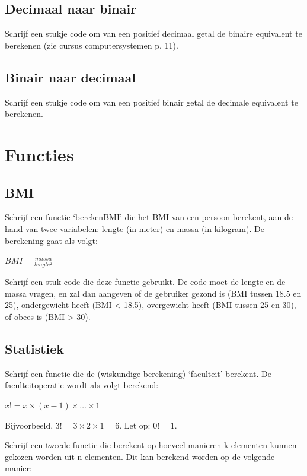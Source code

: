 \subsection{Decimaal naar binair}

Schrijf een stukje code om van een positief decimaal getal de binaire equivalent te berekenen (zie cursus computersystemen p. 11).

\subsection{Binair naar decimaal}

Schrijf een stukje code om van een positief binair getal de decimale equivalent te berekenen.

% 

\section{Functies}

\subsection{BMI}

Schrijf een functie `berekenBMI' die het BMI van een persoon berekent, aan de hand van twee variabelen: lengte (in meter) en massa (in kilogram). De berekening gaat als volgt:

$BMI = \frac{massa}{lengte^2}$

Schrijf een stuk code die deze functie gebruikt. De code moet de lengte en de massa vragen, en zal dan aangeven of de gebruiker gezond is (BMI tussen 18.5 en 25), ondergewicht heeft (BMI < 18.5), overgewicht heeft (BMI tussen 25 en 30), of obees is (BMI > 30).

\subsection{Statistiek}

Schrijf een functie die de (wiskundige berekening) `faculteit' berekent. De faculteitoperatie wordt als volgt berekend:

$x! = x \times (x-1) \times \ldots \times 1$

Bijvoorbeeld, $3! = 3 \times 2 \times 1 = 6$. Let op: $0! = 1$.

Schrijf een tweede functie die berekent op hoeveel manieren k elementen kunnen gekozen worden uit n elementen. Dit kan berekend worden op de volgende manier:

